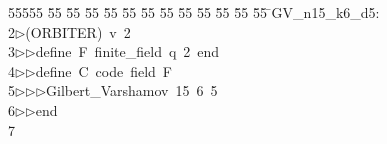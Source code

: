 %
%
\begin{tabbing}
55555 \= 55 \= 55 \= 55 \= 55 \= 55 \= 55 \= 55 \= 55 \= 55 \= 55 \= 55 \= 55 \= \>GV\_n15\_k6\_d5:\\[0pt]
2\>$\triangleright$\>(ORBITER)\ v\ 2\ \\[0pt]
3\>$\triangleright$\>$\triangleright$\>define\ F\ finite\_field\ q\ 2\ end\ \\[0pt]
4\>$\triangleright$\>$\triangleright$\>define\ C\ code\ field\ F\ \\[0pt]
5\>$\triangleright$\>$\triangleright$\>$\triangleright$\>Gilbert\_Varshamov\ 15\ 6\ 5\ \\[0pt]
6\>$\triangleright$\>$\triangleright$\>end\\[0pt]
7\>\end{tabbing}

